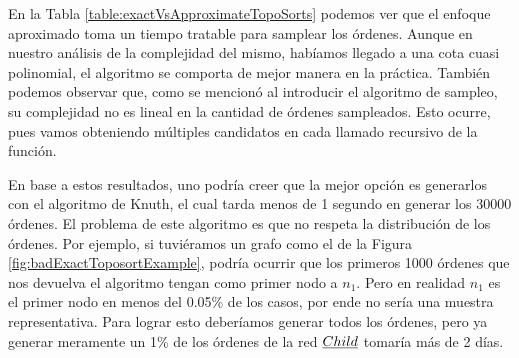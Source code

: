 En la Tabla \ref{table:exactVsApproximateTopoSorts} podemos ver que el enfoque aproximado toma un tiempo tratable para samplear los órdenes. Aunque en nuestro análisis de la complejidad del mismo, habíamos llegado a una cota cuasi polinomial, el algoritmo se comporta de mejor manera en la práctica. También podemos observar que, como se mencionó al introducir el algoritmo de sampleo, su complejidad no es lineal en la cantidad de órdenes sampleados. Esto ocurre, pues vamos obteniendo múltiples candidatos en cada llamado recursivo de la función. 

En base a estos resultados, uno podría creer que la mejor opción es generarlos con el algoritmo de Knuth, el cual tarda menos de 1 segundo en generar los 30000 órdenes. El problema de este algoritmo es que no respeta la distribución de los órdenes.  Por ejemplo, si tuviéramos un grafo como el de la Figura \ref{fig:badExactToposortExample}, podría ocurrir que los primeros 1000 órdenes que nos devuelva el algoritmo tengan como primer nodo a $n_1$. Pero en realidad $n_1$ es el primer nodo en menos del 0.05\% de los casos, por ende no sería una muestra representativa. Para lograr esto deberíamos generar todos los órdenes, pero ya generar meramente un 1\% de los órdenes de la red $\emph{Child}$ tomaría más de 2 días. 



